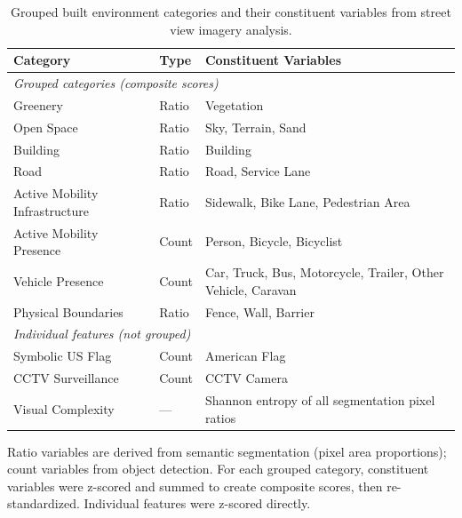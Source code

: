 \begin{table}[htbp]
\centering
\small
\caption{Grouped built environment categories and their constituent variables from street view imagery analysis.}
\label{tab:segmentation_variables}
\begin{tabularx}{\textwidth}{llX}
\toprule
\textbf{Category} & \textbf{Type} & \textbf{Constituent Variables} \\
\midrule
\multicolumn{3}{l}{\textit{Grouped categories (composite scores)}} \\
Greenery & Ratio & Vegetation \\
Open Space & Ratio & Sky, Terrain, Sand \\
Building & Ratio & Building \\
Road & Ratio & Road, Service Lane \\
Active Mobility Infrastructure & Ratio & Sidewalk, Bike Lane, Pedestrian Area \\
Active Mobility Presence & Count & Person, Bicycle, Bicyclist \\
Vehicle Presence & Count & Car, Truck, Bus, Motorcycle, Trailer, Other Vehicle, Caravan \\
Physical Boundaries & Ratio & Fence, Wall, Barrier \\
\midrule
\multicolumn{3}{l}{\textit{Individual features (not grouped)}} \\
Symbolic US Flag & Count & American Flag \\
CCTV Surveillance & Count & CCTV Camera \\
Visual Complexity & --- & Shannon entropy of all segmentation pixel ratios \\
\bottomrule
\end{tabularx}
\begin{flushleft}
\footnotesize
Ratio variables are derived from semantic segmentation (pixel area proportions); count variables from object detection. For each grouped category, constituent variables were z-scored and summed to create composite scores, then re-standardized. Individual features were z-scored directly.
\end{flushleft}
\end{table}
